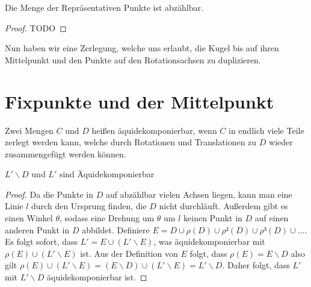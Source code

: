 
\begin{lemma} \label{lemma:abz_menge_rep_punkte}
Die Menge der Repräsentativen Punkte ist abzählbar.
\end{lemma}
\begin{proof}
    TODO
\end{proof}


Nun haben wir eine Zerlegung, welche uns erlaubt, die Kugel bis auf ihren Mittelpunkt und den Punkte auf den Rotationsachsen zu duplizieren.

\section{Fixpunkte und der Mittelpunkt}

\begin{definition}[Äquidekomponierbar] \label{def:aequidekomponierbar} 
Zwei Mengen $C$ und $D$ heißen äquidekomponierbar, wenn $C$ in endlich viele Teile zerlegt werden kann, welche durch
Rotationen und Translationen zu $D$ wieder zusammengefügt werden können.
\leanok {}
\end{definition}

\begin{lemma} \label{lem:aequidekomponierbarkeit}
$L'\backslash D$ und $L'$ sind Äquidekomponierbar
\end{lemma}
\begin{proof}
Da die Punkte in $D$ auf abzählbar vielen Achsen liegen, kann man eine Linie $l$ durch den Ursprung finden, die $D$ nicht durchläuft.
Außerdem gibt es einen Winkel $\theta$, sodass eine Drehung um $\theta$ um $l$ keinen Punkt in $D$ auf einen anderen Punkt in $D$ abbildet.
Definiere $E=D\cup \rho(D)\cup \rho²(D)\cup \rho³(D)\cup...$. Es folgt sofort, dass
$L'=E\cup (L' \backslash E)$, was äquidekomponierbar mit $\rho(E) \cup (L' \backslash E)$ ist.
Aus der Definition von $E$ folgt, dass $\rho(E)=E\backslash D$ also gilt $\rho(E)\cup (L'\backslash E)=(E\backslash D)\cup (L'\backslash E)=
L'\backslash D$. Daher folgt, dass $L'$ mit $L'\backslash D$ äquidekomponierbar ist.
\end{proof}

